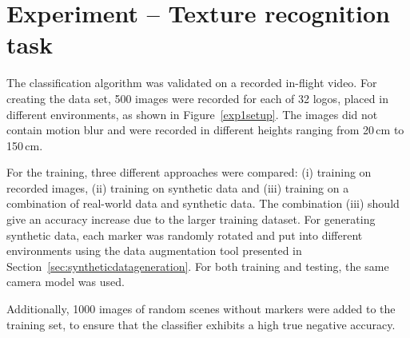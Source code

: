 \section{Experiment -- Texture recognition task} 
\label{sec:experiment1}

The classification algorithm was validated on a recorded in-flight
video. For creating the data set, 500 images were recorded for each of
32 logos, placed in different environments, as shown in
Figure~\ref{exp1setup}. The images did not contain motion blur and
were recorded in different heights ranging from 20\,cm to 150\,cm.

For the training, three different approaches were compared: (i)
training on recorded images, (ii) training on synthetic data and (iii)
training on a combination of real-world data and synthetic data.  The
combination (iii) should give an accuracy increase due to the larger
training dataset. For generating synthetic data, each marker was
randomly rotated and put into different environments using the data
augmentation tool presented in
Section~\ref{sec:syntheticdatageneration}. For both training and
testing, the same camera model was used.

Additionally, 1000 images of random scenes without markers were added
to the training set, to ensure that the classifier exhibits a high
true negative accuracy.
